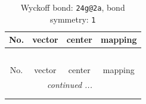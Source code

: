 \documentclass[fleqn,8pt]{jsarticle}
\begin{document}
\renewcommand{\arraystretch}{1.2}
\begin{longtable}{cccc}
\caption{Wyckoff bond: {\tt 24g@2a}, bond symmetry: {\tt 1}}
 \\
 \hline \hline
No. & vector & center & mapping \\ \hline \endfirsthead

\multicolumn{3}{l}{\tablename\ \thetable{}} \\
 \hline \hline
No. & vector & center & mapping \\ \hline \endhead

 \hline \hline
\multicolumn{3}{r}{\footnotesize\it continued ...} \\ \endfoot

 \hline \hline
\multicolumn{3}{r}{} \\ \endlastfoot


\end{longtable}
\end{document}
